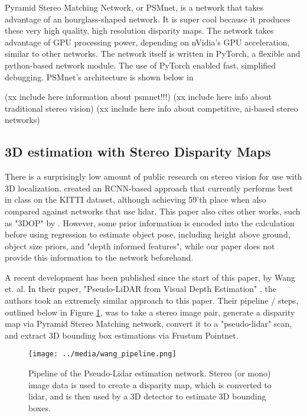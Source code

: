 Pyramid Stereo Matching Network, or PSMnet, is a network that takes advantage of an hourglass-shaped network. It is super cool because it produces these very high quality, high resolution disparity maps. The network takes advantage of GPU processing power, depending on nVidia's GPU acceleration, similar to other networks. The network itself is written in PyTorch, a flexible and python-based network module. The use of PyTorch enabled fast, simplified debugging. PSMnet's architecture is shown below in

(xx include here information about psmnet!!!)
(xx include here info about traditional stereo vision)
(xx include here info about competitive, ai-based stereo networks)




\subsection{3D estimation with Stereo Disparity Maps}
There is a surprisingly low amount of public research on stereo vision for use with 3D localization. \cite{li_stereo_2019} created an RCNN-based approach that currently performs best in class on the KITTI dataset, although achieving 59'th place when also compared against networks that use lidar. This paper also cites other works, such as "3DOP" by \cite{chen_3d_2016}. However, some prior information is encoded into the calculation before using regression to estimate object pose, including height above ground, object size priors, and "depth informed features", while our paper does not provide this information to the network beforehand.

A recent development has been published since the start of this paper, by Wang et. al. In their paper, "Pseudo-LiDAR from Visual Depth Estimation" \cite{wang_pseudo-lidar_2019}, the authors took an extremely similar approach to this paper. Their pipeline / steps, outlined below in Figure \ref{wang_pipeline}, was to take a stereo image pair, generate a disparity map via Pyramid Stereo Matching network, convert it to a "pseudo-lidar" scan, and extract 3D bounding box estimations via Frustum Pointnet. \\

\begin{figure}[h] %
    \texttt{[image: ../media/wang\_pipeline.png]}
    \caption{Pipeline of the Pseudo-Lidar estimation network. Stereo (or mono) image data is used to create a disparity map, which is converted to lidar, and is then used by a 3D detector to estimate 3D bounding boxes.}
    \label{wang_pipeline} %
\end{figure}

